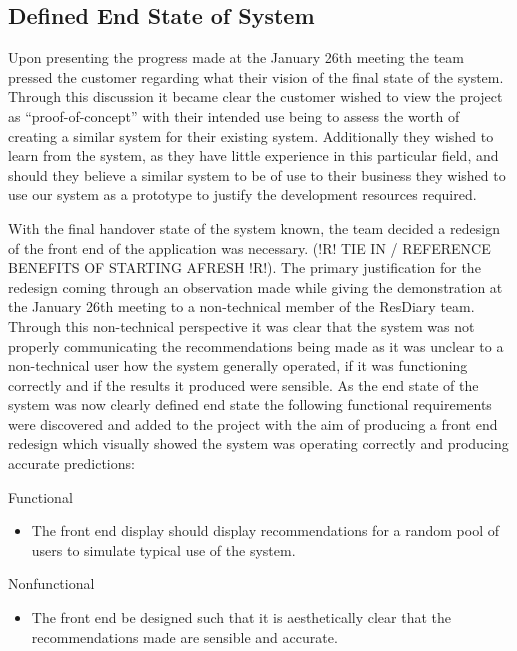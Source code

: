 \documentclass{l3proj}
\begin{document}
\subsection{Defined End State of System}
\label{sec:jandefinedstate}

Upon presenting the progress made at the January 26th meeting the team pressed the customer regarding what their vision of the final state of the system. Through this discussion it became clear the customer wished to view the project as “proof-of-concept” with their intended use being to assess the worth of creating a similar system for their existing system. Additionally they wished to learn from the system, as they have little experience in this particular field, and should they believe a similar system to be of use to their business they wished to use our system as a prototype to justify the development resources required. 

With the final handover state of the system known, the team decided a redesign of the front end of the application was necessary. (!R! TIE IN / REFERENCE BENEFITS OF STARTING AFRESH !R!). The primary justification for the redesign coming through an observation made while giving the demonstration at the January 26th meeting to a non-technical member of the ResDiary team. Through this non-technical perspective it was clear that the system was not properly communicating the recommendations being made as it was unclear to a non-technical user how the system generally operated, if it was functioning correctly and if the results it produced were sensible. As the end state of the system was now clearly defined end state the following functional requirements were discovered and added to the project with the aim of producing a front end redesign which visually showed the system was operating correctly and producing accurate predictions:

Functional
\begin{itemize}
\item The front end display should display recommendations for a random pool of users to simulate typical use of the system.
\end{itemize}

Nonfunctional
\begin{itemize}
\item The front end be designed such that it is aesthetically clear that the recommendations made are sensible and accurate.
\end{itemize}
\end{document}
